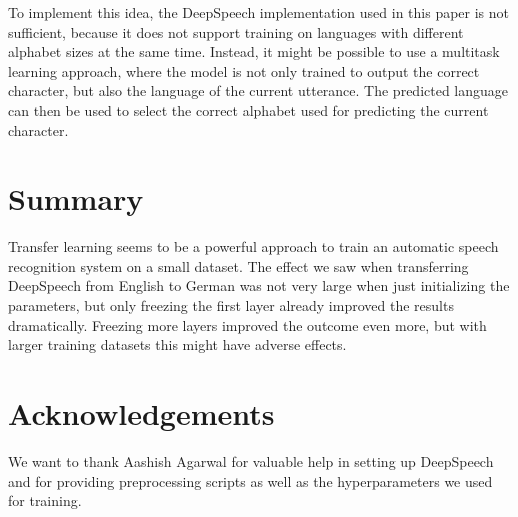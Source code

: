 \documentclass[12pt]{article}    %
\begin{document}
To implement this idea, the DeepSpeech implementation used in this paper is not sufficient, because it does not support training on languages with different alphabet sizes at the same time. Instead, it might be possible to use a multitask learning approach, where the model is not only trained to output the correct character, but also the language of the current utterance. The predicted language can then be used to select the correct alphabet used for predicting the current character.

\section{Summary}
Transfer learning seems to be a powerful approach to train an automatic speech recognition system on a small dataset. The effect we saw when transferring DeepSpeech from English to German was not very large when just initializing the parameters, but only freezing the first layer already improved the results dramatically. Freezing more layers improved the outcome even more, but with larger training datasets this might have adverse effects.

\section{Acknowledgements}
We want to thank Aashish Agarwal for valuable help in setting up DeepSpeech and for providing preprocessing scripts as well as the hyperparameters we used for training.

\printbibliography
\end{document}
